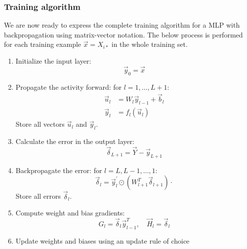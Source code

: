 \documentclass[twoside,english]{uiofysmaster}
\begin{document}
\subsubsection{Training algorithm}
We are now ready to express the complete training algorithm for a MLP with backpropagation using
matrix-vector notation. The below process is performed for each training example $\vec{x} = X_{i*}$ in the whole
training set.
\begin{enumerate}
 \item Initialize the input layer:
 \begin{equation}
  \vec{y}_0 = \vec{x}
 \end{equation}
 \item Propagate the activity forward: for $l = 1,\dots,L+1$:
 \begin{align}
  \vec{u}_l &= W_l\vec{y}_{l-1} + \vec{b}_l \\
  \vec{y}_l &= f_l(\vec{u}_l)
 \end{align}
 Store all vectors $\vec{u}_l$ and $\vec{y}_l$.
 \item Calculate the error in the output layer:
 \begin{equation}
  \vec{\delta}_{L+1} = \vec{Y} - \vec{y}_{L+1}
 \end{equation}
 \item Backpropagate the error: for $l = L, L-1, \dots ,1$:
 \begin{equation}
 \vec{\delta}_l = \vec{y}^\prime_l \odot (W^T_{l+1}\vec{\delta}_{l+1}) \cdot 
 \end{equation}
 Store all errors $\vec{\delta}_l$. 
 \item Compute weight and bias gradients: 
 \begin{equation}
  G_l = \vec{\delta}_l \vec{y}_{l-1}^T, \quad \vec{H}_l = \vec{\delta}_l
 \end{equation}
 \item Update weights and biases using an update rule of choice
\end{enumerate}
\end{document}
